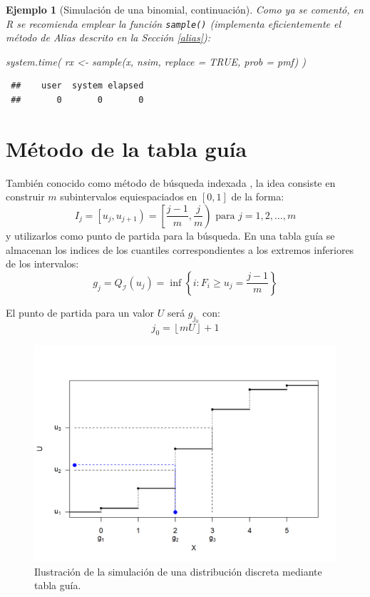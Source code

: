\documentclass[
  10pt,
]{book}
\newenvironment{Shaded}{\begin{snugshade}}{\end{snugshade}}
\newcommand{\AttributeTok}[1]{\textcolor[rgb]{0.77,0.63,0.00}{#1}}
\newcommand{\ConstantTok}[1]{\textcolor[rgb]{0.00,0.00,0.00}{#1}}
\newcommand{\FunctionTok}[1]{\textcolor[rgb]{0.00,0.00,0.00}{#1}}
\newcommand{\NormalTok}[1]{#1}
\newcommand{\OtherTok}[1]{\textcolor[rgb]{0.56,0.35,0.01}{#1}}
\theoremstyle{break}
\newtheorem{example}{Ejemplo}[chapter]
\theoremstyle{nonumberplain}
\begin{document}
\begin{example}[Simulación de una binomial, continuación]
Como ya se comentó, en R se recomienda emplear la función \texttt{sample()}
(implementa eficientemente el método de Alias descrito en la Sección \ref{alias}):

\begin{Shaded}
\begin{Highlighting}[]
\FunctionTok{system.time}\NormalTok{( rx }\OtherTok{\textless{}{-}} \FunctionTok{sample}\NormalTok{(x, nsim, }\AttributeTok{replace =} \ConstantTok{TRUE}\NormalTok{, }\AttributeTok{prob =}\NormalTok{ pmf) )}
\end{Highlighting}
\end{Shaded}

\begin{verbatim}
 ##    user  system elapsed 
 ##       0       0       0
\end{verbatim}

\end{example}

\hypertarget{muxe9todo-de-la-tabla-guuxeda}{%
\section{Método de la tabla guía}\label{muxe9todo-de-la-tabla-guuxeda}}

También conocido como método de búsqueda indexada \citep[\emph{Indexed Search},][]{chen1974}, la idea consiste en construir \(m\) subintervalos equiespaciados en \([0,1]\) de la forma:
\[I_{j}=\left[ u_{j},u_{j+1}\right) =\left[ \frac{j-1}{m},\frac{j}{m}\right) 
\text{ para }j=1,2,\ldots ,m\]
y utilizarlos como punto de partida para la búsqueda.
En una tabla guía se almacenan los indices de los cuantiles correspondientes a los extremos inferiores de los intervalos:
\[g_{j}=Q_{\mathcal{I}}(u_{j})=\inf \left\{ i:F_{i}\geq u_{j}=\frac{j-1}{m}\right\}\]

El punto de partida para un valor \(U\) será \(g_{j_{0}}\) con:
\[j_{0}=\left\lfloor mU\right\rfloor +1\]

\begin{figure}[!htbp]

{\centering \includegraphics[width=0.8\linewidth]{images/tabla-sim} 

}

\caption{Ilustración de la simulación de una distribución discreta mediante tabla guía.}\label{fig:tabla-movie}
\end{figure}
\end{document}
